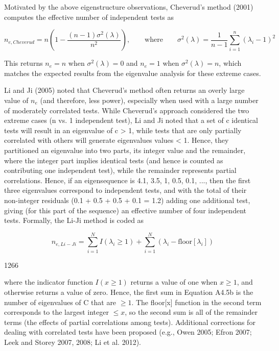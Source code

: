 \documentclass{article}
\begin{document}
Motivated by the above eigenstructure observations, Cheverud's method (2001) computes the effective number of independent tests as

\begin{equation}
n_{e,Cheverud}=n\left(1-\frac{(n-1)\sigma^{2}(\lambda)}{n^{2}}\right),\qquad\mathrm{where}\qquad\sigma^{2}(\lambda)=\frac{1}{n-1}\sum_{i=1}^{n}(\lambda_{i}-1)^{2}
\end{equation}

This returns  $ n_e = n $ when  $ \sigma^2(\lambda) = 0 $ and  $ n_e = 1 $ when  $ \sigma^2(\lambda) = n $, which matches the expected results from the eigenvalue analysis for these extreme cases.

Li and Ji (2005) noted that Cheverud's method often returns an overly large value of  $ n_e $ (and therefore, less power), especially when used with a large number of moderately correlated tests. While Cheverud's approach considered the two extreme cases (n vs. 1 independent test), Li and Ji noted that a set of c identical tests will result in an eigenvalue of c > 1, while tests that are only partially correlated with others will generate eigenvalues values < 1. Hence, they partitioned an eigenvalue into two parts, its integer value and the remainder, where the integer part implies identical tests (and hence is counted as contributing one independent test), while the remainder represents partial correlations. Hence, if an eigensequence is 4.1, 3.5, 1, 0.5, 0.1, ..., then the first three eigenvalues correspond to independent tests, and with the total of their non-integer residuals (0.1 + 0.5 + 0.5 + 0.1 = 1.2) adding one additional test, giving (for this part of the sequence) an effective number of four independent tests. Formally, the Li-Ji method is coded as

\begin{equation}
n_{e,Li-Ji}=\sum_{i=1}^{N}I(\lambda_{i}\geq1)+\sum_{i=1}^{N}(\lambda_{i}-\mathrm{floor}[\lambda_{i}])
\end{equation}

1266

where the indicator function  $ I(x \geq 1) $ returns a value of one when  $ x \geq 1 $, and otherwise returns a value of zero. Hence, the first sum in Equation A4.5b is the number of eigenvalues of C that are  $ \geq 1 $. The floor[x] function in the second term corresponds to the largest integer  $ \leq x $, so the second sum is all of the remainder terms (the effects of partial correlations among tests). Additional corrections for dealing with correlated tests have been proposed (e.g., Owen 2005; Efron 2007; Leek and Storey 2007, 2008; Li et al. 2012).
\end{document}
